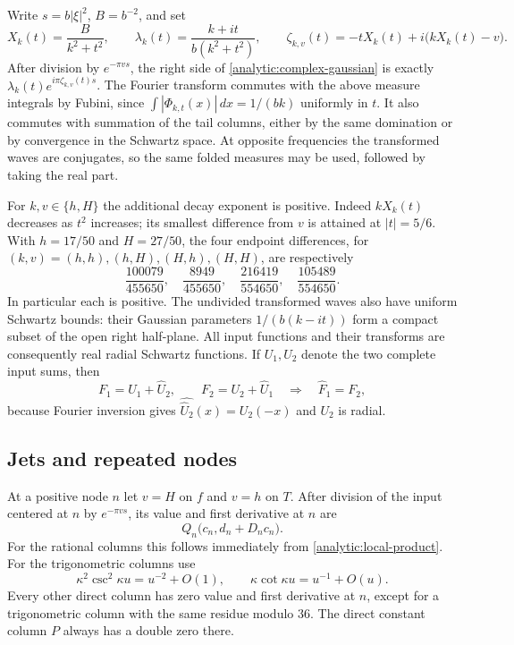 \documentclass[11pt]{article}
\theoremstyle{remark}\newtheorem{remark}[theorem]{Remark}
\begin{document}
Write $s=b|\xi|^2$, $B=b^{-2}$, and set
\begin{equation}\label{analytic:fourier-wave}
 X_k(t)=\frac{B}{k^2+t^2},\qquad
 \lambda_k(t)=\frac{k+it}{b(k^2+t^2)},\qquad
 \zeta_{k,v}(t)=-tX_k(t)+i\bigl(kX_k(t)-v\bigr).
\end{equation}
After division by $e^{-\pi vs}$, the right side of
\eqref{analytic:complex-gaussian} is exactly
$\lambda_k(t)e^{i\pi\zeta_{k,v}(t)s}$.
The Fourier transform commutes with the above measure integrals by
Fubini, since $\int|\Phi_{k,t}(x)|\,dx=1/(bk)$ uniformly in $t$.
It also commutes with summation of the tail columns, either by the
same domination or by convergence in the Schwartz space.
At opposite frequencies the transformed waves are conjugates, so the
same folded measures may be used, followed by taking the real part.

For $k,v\in\{h,H\}$ the additional decay exponent is positive.
Indeed $kX_k(t)$ decreases as $t^2$ increases; its smallest difference
from $v$ is attained at $|t|=5/6$.  With $h=17/50$ and $H=27/50$,
the four endpoint differences, for $(k,v)=(h,h),(h,H),(H,h),(H,H)$,
are respectively
\[
 \frac{100079}{455650},\quad
 \frac{8949}{455650},\quad
 \frac{216419}{554650},\quad
 \frac{105489}{554650}.
\]
In particular each is positive.  The undivided transformed waves
also have uniform Schwartz bounds: their Gaussian parameters
$1/(b(k-it))$ form a compact subset of the open right half-plane.
All input functions and their transforms are consequently real radial
Schwartz functions.  If $U_1,U_2$ denote the two complete input sums,
then
\[
 F_1=U_1+\widehat U_2,\qquad F_2=U_2+\widehat U_1
 \quad\Longrightarrow\quad \widehat F_1=F_2,
\]
because Fourier inversion gives $\widehat{\widehat U_2}(x)=U_2(-x)$
and $U_2$ is radial.

\subsection{Jets and repeated nodes}

At a positive node $n$ let $v=H$ on $f$ and $v=h$ on $T$.
After division of the input centered at $n$ by $e^{-\pi vs}$,
its value and first derivative at $n$ are
\begin{equation}\label{analytic:direct-jets}
 Q_n\bigl(c_n,d_n+D_nc_n\bigr).
\end{equation}
For the rational columns this follows immediately from
\eqref{analytic:local-product}.  For the trigonometric columns use
\[
 \kappa^2\csc^2\kappa u=u^{-2}+O(1),\qquad
 \kappa\cot\kappa u=u^{-1}+O(u).
\]
Every other direct column has zero value and first derivative at $n$,
except for a trigonometric column with the same residue modulo $36$.
The direct constant column $P$ always has a double zero there.
\end{document}
